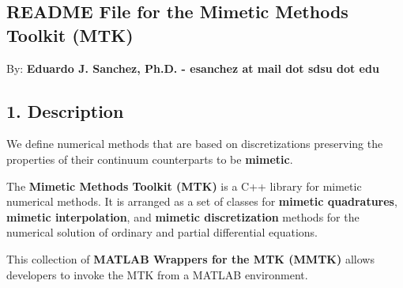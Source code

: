 
\begin{DoxyPre}
\section*{README File for the Mimetic Methods Toolkit (MTK)}\end{DoxyPre}



\begin{DoxyPre}\end{DoxyPre}



\begin{DoxyPre}By: {\bfseries Eduardo J. Sanchez, Ph.D. - esanchez at mail dot sdsu dot edu}


\end{DoxyPre}



\begin{DoxyPre}\subsection*{1. Description}\end{DoxyPre}



\begin{DoxyPre}\end{DoxyPre}



\begin{DoxyPre}We define numerical methods that are based on discretizations preserving the
properties of their continuum counterparts to be {\bfseries mimetic}.\end{DoxyPre}



\begin{DoxyPre}The {\bfseries Mimetic Methods Toolkit (MTK)} is a C++ library for mimetic numerical
methods. It is arranged as a set of classes for {\bfseries mimetic quadratures},
{\bfseries mimetic interpolation}, and {\bfseries mimetic discretization} methods for the
numerical solution of ordinary and partial differential equations.\end{DoxyPre}



\begin{DoxyPre}This collection of {\bfseries MATLAB Wrappers for the MTK (MMTK)} allows developers to
invoke the MTK from a MATLAB environment.\end{DoxyPre}



